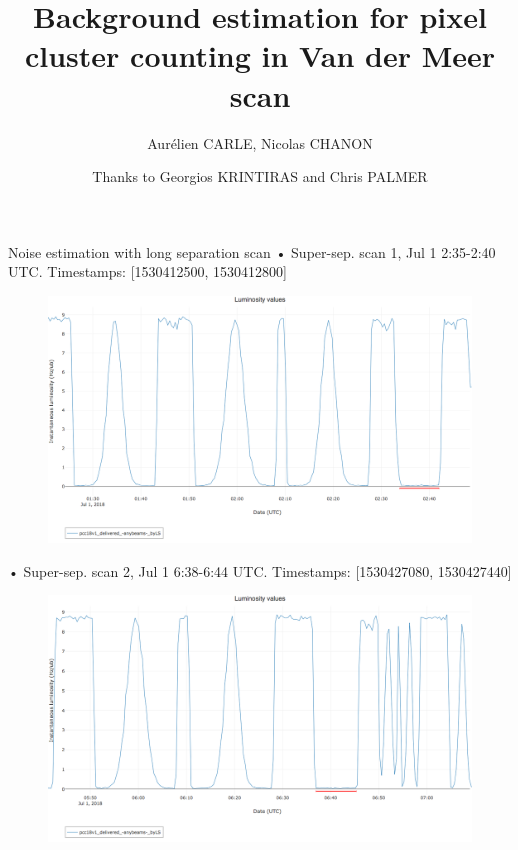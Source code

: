 \documentclass{beamer}
\begin{document}
	\author{Aurélien CARLE, Nicolas CHANON}
	\date{Thanks to Georgios KRINTIRAS and Chris PALMER}
	\title{Background estimation for pixel cluster counting in Van der Meer scan}
	\maketitle
	\newpage

	\begin{frame}
		\begin{block}{Noise estimation with long separation scan}
			\tiny{• Super-sep. scan 1, Jul 1 2:35-2:40 UTC. Timestamps: [1530412500, 1530412800]}
			\begin{figure}[H!]
				\begin{center}
					\includegraphics[scale=0.5]{longsepscan_1.png}
				\end{center}
			\end{figure}
			 \tiny{• Super-sep. scan 2, Jul 1 6:38-6:44 UTC. Timestamps: [1530427080, 1530427440]}
		
			\begin{figure}[H!]
				\begin{center}
					\includegraphics[scale=0.5]{longsepscan_2.png}
				\end{center}
			\end{figure}
		\end{block}
	\end{frame}
\end{document}
